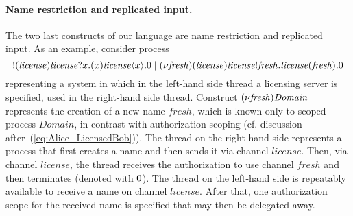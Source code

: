 \paragraph{{Name restriction and replicated input}.}   The two last constructs of our language are name restriction and replicated input. As an example, consider process
%
$$!({\mathit{license}}){\mathit{license}}?x.(x)\mathit{license}\langle x\rangle.0
\;|\; (\nu \mathit{fresh}) (\mathit{license}) 
\mathit{license}!\mathit{fresh}.
\mathit{license}(\mathit{fresh}). 0
$$
%
representing a system in which in the left-hand side thread a licensing server is specified, used in the
right-hand side thread. Construct $(\nu \mathit{fresh})
\mathit{Domain}$ 
represents the creation of a new name $\mathit{fresh}$, which is known only to scoped process
$\mathit{Domain}$, in contrast with authorization scoping (cf. discussion after~(\ref{eq:Alice_LicensedBob})). %
The thread on the right-hand side represents a process that  
first creates a name and then sends it via channel 
$\mathit{license}$. Then, via channel $\mathit{license}$, the thread receives the authorization to 
use channel $\mathit{fresh}$ 
and then terminates (denoted with $0$). The thread on the left-hand side is repeatably available to receive a name on 
channel $\mathit{license}$. After that, one authorization scope for
the received name is specified that may then be delegated away. %

